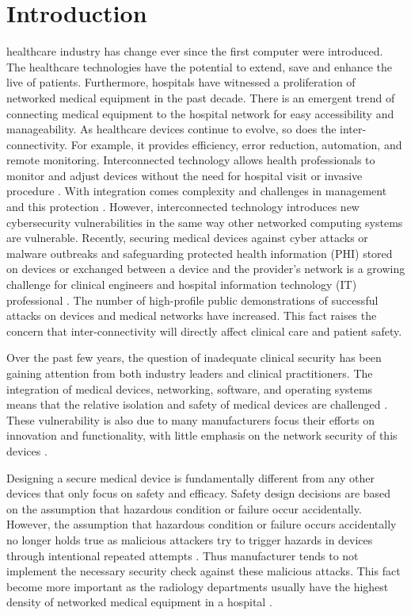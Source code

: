 \documentclass[pdf,bookmarks,colorlinks=true]{IEEEtran}
\begin{document}
\section{Introduction}
 healthcare industry has change ever since the first computer were introduced. The healthcare technologies have the potential to extend, save and enhance the live of patients. Furthermore, hospitals have witnessed a proliferation of networked medical equipment in the past decade. There is an emergent trend of connecting medical equipment to the hospital network for easy accessibility and manageability. As healthcare devices continue to evolve, so does the inter-connectivity. For example, it provides efficiency, error reduction, automation, and remote monitoring. Interconnected technology allows health professionals to monitor and adjust devices without the need for hospital visit or invasive procedure \cite{coventry2018cybersecurity}. With integration comes complexity and challenges in management and this protection \cite{williams2015cybersecurity}. However, interconnected technology introduces new cybersecurity vulnerabilities in the same way other networked computing systems are vulnerable. Recently, securing medical devices against cyber attacks or malware outbreaks and safeguarding protected health information (PHI) stored on devices or exchanged between a device and the provider's network is a growing challenge for clinical engineers and hospital information technology (IT) professional \cite{wirth2011cybercrimes}. The number of high-profile public demonstrations of successful attacks on devices and medical networks have increased. This fact raises the concern that inter-connectivity will directly affect clinical care and patient safety. \par
Over the past few years, the question of inadequate clinical security has been gaining attention from both industry leaders and clinical practitioners. The integration of medical devices, networking, software, and operating systems means that the relative isolation and safety of medical devices are challenged \cite{williams2015cybersecurity}. These vulnerability is also due to many manufacturers focus their efforts on innovation and functionality, with little emphasis on the network security of this devices \cite{moses2015lack}. \par
Designing a secure medical device is fundamentally different from  any other devices that only focus on safety and efficacy. Safety design decisions are based on the assumption that hazardous condition or failure occur accidentally. However, the assumption that hazardous condition or failure occurs accidentally no longer holds true as malicious attackers try to trigger hazards in devices through intentional repeated attempts \cite{Ray}. Thus manufacturer tends to not implement the necessary security check against these malicious attacks. This fact become more important as the radiology departments usually have the highest density of networked medical equipment in a hospital \cite{moses2015lack}. 
\end{document}
